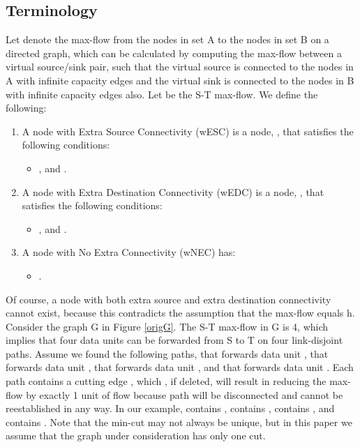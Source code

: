 \documentclass[conference]{IEEEtran}
\begin{document}
\subsection{Terminology}
Let  denote the max-flow from the nodes in set A to the nodes in set B on a directed graph, which can be calculated by computing the max-flow between a virtual source/sink pair, such that the virtual source is connected to the nodes in A with infinite capacity edges and the virtual sink is connected to the nodes in B with infinite capacity edges also. Let  be the S-T max-flow. We define the following:

\begin{enumerate}
\item A node with Extra Source Connectivity (wESC) is a node, , that satisfies the following conditions:
\begin{itemize}
\item , and .
\end{itemize}
\item A node with Extra Destination Connectivity (wEDC) is a node, , that satisfies the following conditions:
\begin{itemize}
\item , and .
\end{itemize}
\item A node with No Extra Connectivity (wNEC) has:
\begin{itemize}
\item .
\end{itemize}
\end{enumerate}

Of course, a node with both extra source and extra destination connectivity cannot exist, because this contradicts the assumption that the max-flow equals h. Consider the graph G in Figure \ref{origG}. The S-T max-flow in G is 4, which implies that four data units can be forwarded from S to T on four link-disjoint paths. Assume we found the following paths,  that forwards data unit ,  that forwards data unit ,  that forwards data unit , and   that forwards data unit . Each path  contains a cutting edge , which , if deleted, will result in reducing the max-flow by exactly 1 unit of flow because path  will be disconnected and cannot be reestablished in any way. In our example,  contains ,  contains ,  contains , and  contains . Note that the min-cut may not always be unique, but in this paper we assume that the graph under consideration has only one cut.
\end{document}
